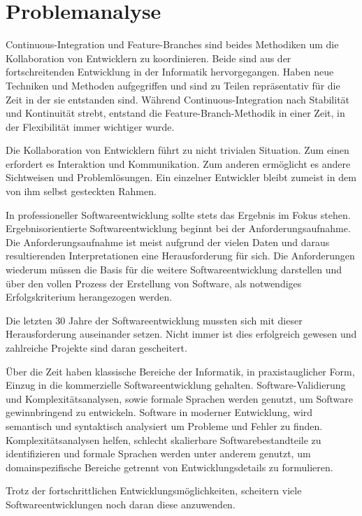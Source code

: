 \chapter{Problemanalyse}

Continuous-Integration und Feature-Branches sind beides Methodiken um die Kollaboration von Entwicklern zu koordinieren. Beide sind aus der fortschreitenden Entwicklung in der Informatik hervorgegangen. Haben neue Techniken und Methoden aufgegriffen und sind zu Teilen repräsentativ für die Zeit in der sie entstanden sind. Während Continuous-Integration nach Stabilität und Kontinuität strebt, entstand die Feature-Branch-Methodik in einer Zeit, in der Flexibilität immer wichtiger wurde.

Die Kollaboration von Entwicklern führt zu nicht trivialen Situation. Zum einen erfordert es Interaktion und Kommunikation. Zum anderen ermöglicht es andere Sichtweisen und Problemlösungen. Ein einzelner Entwickler bleibt zumeist in dem von ihm selbst gesteckten Rahmen.

In professioneller Softwareentwicklung sollte stets das Ergebnis im Fokus stehen. Ergebnisorientierte Softwareentwicklung beginnt bei der Anforderungsaufnahme. Die Anforderungsaufnahme ist meist aufgrund der vielen Daten und daraus resultierenden Interpretationen eine Herausforderung für sich. Die Anforderungen wiederum müssen die Basis für die weitere Softwareentwicklung darstellen und über den vollen Prozess der Erstellung von Software, als notwendiges Erfolgskriterium herangezogen werden.

Die letzten 30 Jahre der Softwareentwicklung mussten sich mit dieser Herausforderung auseinander setzen. Nicht immer ist dies erfolgreich gewesen und zahlreiche Projekte sind daran gescheitert.

Über die Zeit haben klassische Bereiche der Informatik, in praxistauglicher Form, Einzug in die kommerzielle Softwareentwicklung gehalten. Software-Validierung und Komplexitätsanalysen, sowie formale Sprachen werden genutzt, um Software gewinnbringend zu entwickeln. Software in moderner Entwicklung, wird semantisch und syntaktisch analysiert um Probleme und Fehler zu finden. Komplexitätsanalysen helfen, schlecht skalierbare Softwarebestandteile zu identifizieren und formale Sprachen werden unter anderem genutzt, um domainspezifische Bereiche getrennt von Entwicklungsdetails zu formulieren.

Trotz der fortschrittlichen Entwicklungsmöglichkeiten, scheitern viele Softwareentwicklungen noch daran diese anzuwenden.

